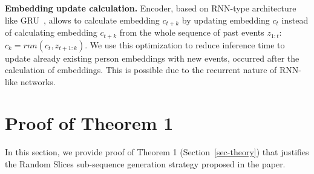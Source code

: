 \documentclass{article}
\newtheorem{thm}{Theorem}
\renewcommand{\P}{\mathbb{P}}
\begin{document}
\textbf{Embedding update calculation.} Encoder, based on RNN-type architecture like GRU~\citep{Cho2014LearningPR}, allows to calculate embedding $c_{t+k}$ by updating embedding $c_t$ instead of  calculating embedding $c_{t+k}$ from the whole sequence of past events $z_{1:t}$: $c_k = rnn(c_t, z_{t+1:k})$. We use this optimization to reduce inference time to update already existing person embeddings with new events, occurred after the calculation of embeddings. This is possible due to the recurrent nature of RNN-like networks.

\section{Proof of Theorem 1} \label{app-sec-proof}

In this section, we provide proof of Theorem 1 (Section~\ref{sec-theory}) that justifies the Random Slices sub-sequence generation strategy proposed in the paper.


\end{document}
